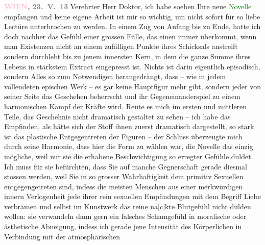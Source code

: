 \pstart
           \raggedleft{}\textcolor{gray}{\textbf{\textcolor{pink}{WIEN}\ledrightnote{\textcolor{pink}{Wien}},{ }23. V. 13}}\pend
           \vspace{0.5em}
\pstart
           Verehrter Herr Doktor, ich habe soeben Ihre neue \textcolor{green}{Novelle}\ledrightnote{{$\rightarrow$}\emph{\textcolor{green}{Frau Beate und ihr Sohn. Novelle}}} empfangen und keine eigene Arbeit
               ist mir so wichtig, um nicht sofort für so liebe Lectüre unterbrochen zu werden. In
               einem Zug von Anfang bis zu Ende, hatte ich doch nachher das Gefühl einer grossen
               Fülle, das einen immer überkommt, wenn man Existenzen nicht an einem zufälligen
               Punkte ihres Schicksals anstreift sondern durchlebt bis zu jenem innersten Kern, in
               dem die ganze Summe ihres Lebens in stärkstem Extract eingepresst ist. Nichts ist
               darin eigentlich episodisch, sondern Alles so zum {\pb}Notwendigen herangedrängt, dass – wie in
               jedem vollendeten epischen Werk – es gar keine Hauptfigur mehr gibt, sondern jeder
               von seiner Seite das Geschehen beherrscht und ihr Gegeneinanderspiel zu einem
               harmonischen Kampf der Kräfte wird. Reute es mich im ersten und mittleren Teile, das
               Geschehnis nicht dramatisch gestaltet zu sehen – ich habe das Empfinden, als hätte
               sich der Stoff ihnen zuerst dramatisch dargestellt, so stark ist das  plastische Entgegentreten der Figuren – der
               Schluss überzeugte mich durch seine Harmonie, dass hier die Form zu wählen war, die
               Novelle das einzig mögliche, weil nur sie die erhabene Beschwichtigung so erregter
               Gefühle duldet. Ich muss für sie befürchten, dass Sie auf manche Gegnerschaft gera{\pb}de diesmal stossen werden, weil Sie in
               so grosser Wahrhaftigkeit dem primitiv Sexuellen entgegengetreten sind, indess die
               meisten Menschen aus einer merkwürdigen innern Verlogenheit jede ihrer rein sexuellen
               Empfindungen mit dem Begriff Liebe verbrämen und 
               selbst im Kunstwerk das reine na{[}c{]}kte Blutgefühl nicht dulden wollen: sie verwandeln
               dann gern ein falsches Schamgefühl in moralische oder ästhetische Abneigung, indess
               ich gerade jene Intensität des Körperlichen in Verbindung mit der atmosphärischen
